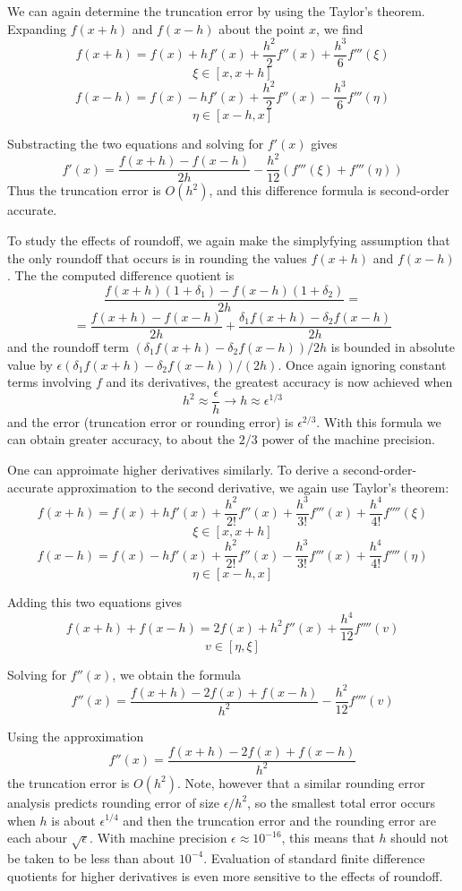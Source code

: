 We can again determine the truncation error by using the Taylor's theorem. Expanding $f(x + h)$ and $f(x - h)$ about the point $x$, we find
\[ f(x + h) = f(x) + h f'(x) + \frac{h^2}{2} f''(x) + \frac{h^3}{6} f'''(\xi) \]
\[ \xi \in [x, x+h] \]
\[ f(x - h) = f(x) - h f'(x) + \frac{h^2}{2} f''(x) - \frac{h^3}{6} f'''(\eta) \]
\[ \eta \in [x-h, x] \]

Substracting the two equations and solving for $f'(x)$ gives
\[ f'(x) = \frac{f(x + h) - f(x - h)}{2h} - \frac{h^2}{12} (f'''(\xi) + f'''(\eta)) \]
Thus the truncation error is $O(h^2)$, and this difference formula is second-order accurate.

To study the effects of roundoff, we again make the simplyfying assumption that the only roundoff that occurs is in rounding the values $f(x + h)$ and $f(x - h)$. The the computed difference quotient is
\[ \frac{f(x + h) (1 + \delta_1) - f(x - h)(1 + \delta_2)}{2h} = \]
\[ = \frac{f(x + h) - f(x - h)}{2h} + \frac{\delta_1 f(x + h) - \delta_2 f(x - h)}{2h} \]
and the roundoff term $(\delta_1 f(x + h) - \delta_2 f(x - h)) / 2h$ is bounded in absolute value by $\epsilon (\delta_1 f(x + h) - \delta_2 f(x - h)) / (2h)$. Once again ignoring constant terms involving $f$ and its derivatives, the greatest accuracy is now achieved when
\[ h^2 \approx \frac{\epsilon}{h} \rightarrow h \approx \epsilon^{1/3} \]
and the error (truncation error or rounding error) is $\epsilon^{2/3}$. With this formula we can obtain greater accuracy, to about the $2/3$ power of the machine precision.

One can approimate higher derivatives similarly. To derive a second-order-accurate approximation to the second derivative, we again use Taylor's theorem:
\[ f(x + h)  = f(x) + h f'(x) + \frac{h^2}{2!} f''(x) + \frac{h^3}{3!} f'''(x) + \frac{h^4}{4!} f''''(\xi) \]
\[ \xi \in [x, x+h] \]
\[ f(x - h) = f(x) - h f'(x) + \frac{h^2}{2!} f''(x) - \frac{h^3}{3!} f'''(x) + \frac{h^4}{4!} f''''(\eta) \]
\[ \eta \in [x - h, x] \]

Adding this two equations gives
\[ f(x + h) + f(x - h) = 2 f(x) + h^2 f''(x) + \frac{h^4}{12} f''''(v) \]
\[ v \in [\eta, \xi] \]

Solving for $f''(x)$, we obtain the formula
\[ f''(x) = \frac{f(x + h) - 2 f(x) + f(x - h)}{h^2} - \frac{h^2}{12} f''''(v)\]

Using the approximation
\begin{equation}
    f''(x) = \frac{f(x + h) - 2 f(x) + f(x - h)}{h^2}
    \label{Eq: (9.3)}
\end{equation}
the truncation error is $O(h^2)$. Note, however that a similar rounding error analysis predicts rounding error of size $\epsilon / h^2$, so the smallest total error occurs when $h$ is about $\epsilon^{1/4}$ and then the truncation error and the rounding error are each abour $\sqrt{\epsilon}$. With machine precision $\epsilon \approx 10^{-16}$, this means that $h$ should not be taken to be less than about $10^{-4}$. Evaluation of standard finite difference quotients for higher derivatives is even more sensitive to the effects of roundoff.

